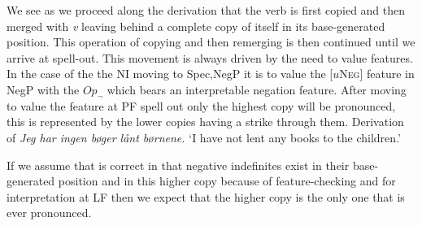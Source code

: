 \documentclass[12pt, letterpaper]{article}
\begin{document}
We see as we proceed along the derivation that the verb is first copied and then merged with \emph{v} leaving behind a complete copy of itself in its base-generated position. This operation of copying and then remerging is then continued until we arrive at spell-out. This movement is always driven by the need to value features. In the case of the the NI moving to Spec,NegP it is to value the [{$u$\textsc{Neg}}] feature in NegP with the $Op_\neg$ which bears an interpretable negation feature. After moving to value the feature at PF spell out only the highest copy will be pronounced, this is represented by the lower copies having a strike through them. 
\ea Derivation of \emph{Jeg har ingen bøger lånt børnene.} `I have not lent any books to the children.' \label{ex:Copy}
\z 

If we assume that \citet{zeijlstraSyntacticallyComplexStatus2011} is correct in that negative indefinites exist in their base-generated position and in this higher copy because of feature-checking and for interpretation at LF then we expect that the higher copy is the only one that is ever pronounced.

\end{document}
